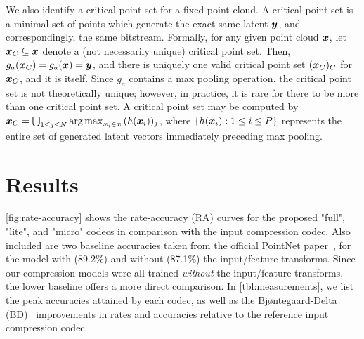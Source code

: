 We also identify a critical point set for a fixed point cloud.
A critical point set is a minimal set of points which generate the exact same latent ${\boldsymbol{y}}$, and correspondingly, the same bitstream.
Formally, for any given point cloud ${\boldsymbol{x}}$, let ${\boldsymbol{x}}_C \subseteq {\boldsymbol{x}}$ denote a (not necessarily unique) critical point set.
Then, $g_a({\boldsymbol{x}}_C) = g_a({\boldsymbol{x}}) = {\boldsymbol{y}}$, and there is uniquely one valid critical point set $({\boldsymbol{x}}_C)_C$ for ${\boldsymbol{x}}_C$, and it is itself.
Since $g_a$ contains a max pooling operation, the critical point set is not theoretically unique; however, in practice, it is rare for there to be more than one critical point set.
A critical point set may be computed by
${\boldsymbol{x}}_C = \bigcup_{1 \leq j \leq N} \operatorname*{arg\,max}_{{\boldsymbol{x}}_i \in {\boldsymbol{x}}} \, (h({\boldsymbol{x}}_i))_j$,
where $\{h({\boldsymbol{x}}_i) : 1 \leq i \leq P\}$ represents the entire set of generated latent vectors immediately preceding max pooling.




\section{Results}
\label{sec:results}

\cref{fig:rate-accuracy} shows the rate-accuracy (RA) curves for the proposed "full", "lite", and "micro" codecs in comparison with the input compression codec.
Also included are two baseline accuracies taken from the official PointNet paper~\cite{qi2016pointnet}, for the model with (89.2\%) and without (87.1\%) the input/feature transforms.
Since our compression models were all trained \emph{without} the input/feature transforms, the lower baseline offers a more direct comparison.
In \cref{tbl:measurements}, we list the peak accuracies attained by each codec, as well as the Bjøntegaard-Delta (BD)~\cite{bjontegaard2001calculation} improvements in rates and accuracies relative to the reference input compression codec.


